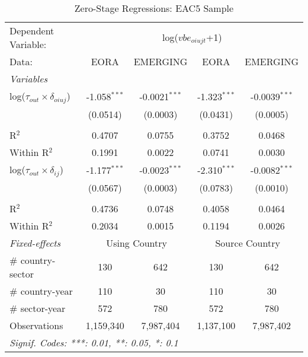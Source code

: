 \documentclass[a4paper]{article}
\begin{document}
\begin{table}[h!]
   \caption{\label{tab:ZS_EAC} Zero-Stage Regressions: EAC5 Sample}
   \centering
   \begin{tabular}{lcccc}
      \tabularnewline \midrule \midrule
      Dependent Variable: & \multicolumn{4}{c}{log($vbe_{oiujt}$+1)}\\
      Data:                           & EORA           & EMERGING        & EORA           & EMERGING \\   
      \midrule
      \emph{Variables}\\      
      log($\tau_{out}\times \delta_{oiuj}$)  & -1.058$^{***}$ & -0.0021$^{***}$ & -1.323$^{***}$ & -0.0039$^{***}$\\\     
                                       & (0.0514)       & (0.0003)        & (0.0431)       & (0.0005)\\ \\
      R$^2$                            & 0.4707         & 0.0755          & 0.3752         & 0.0468\\   
      Within R$^2$                      & 0.1991         & 0.0022          & 0.0741         & 0.0030\\
      \midrule
      log($\tau_{out}\times \delta_{ij}$) & -1.177$^{***}$ & -0.0023$^{***}$ & -2.310$^{***}$ & -0.0082$^{***}$\\     
                                           & (0.0567)       & (0.0003)        & (0.0783)       & (0.0010)\\  \\
      R$^2$                                & 0.4736         & 0.0748          & 0.4058         & 0.0464\\   
      Within R$^2$                         & 0.2034         & 0.0015          & 0.1194         & 0.0026\\  
      \midrule
      \emph{Fixed-effects} & \multicolumn{2}{c}{Using Country} & \multicolumn{2}{c}{Source Country} \\
      \# country-sector       & 130            & 642              & 130            & 642\\  
      \# country-year               & 110            & 30              & 110            & 30\\  
      \# sector-year                & 572            & 780             & 572            & 780\\ 
      \midrule
      Observations                     & 1,159,340      & 7,987,404       & 1,137,100      & 7,987,402\\ 
      \midrule \midrule
      \multicolumn{5}{l}{\emph{Signif. Codes: ***: 0.01, **: 0.05, *: 0.1}}\\
   \end{tabular}
\end{table}
\FloatBarrier
\end{document}
